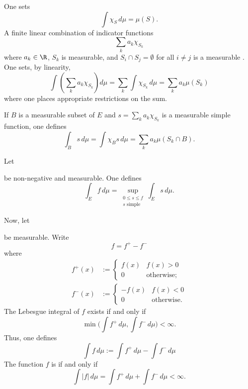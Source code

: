 \documentclass [preview, border = 20pt] {standalone}
\begin{document}
\pagecolor{black}
\color{white}
One sets
\[
  \int \chi_S\, d\mu = \mu(S).
\]
A finite linear combination of indicator functions
\[
  \sum_k a_k\chi_{S_k}
\]
where $a_k\in \R$, $S_k$ is measurable, and $S_i\cap S_j = \emptyset$ for all $i\ne j$ is a measurable . One sets, by linearity,
\[
  \int \left(\sum_k a_k \chi_{S_k}\right) d\mu = \sum_k \int \chi_{S_k}\,d\mu = \sum_k a_k\mu(S_k)
\]
where one places appropriate restrictions on the sum.

If $B$ is a measurable subset of $E$ and $s = \sum_k a_k \chi_{S_k}$ is a measurable simple function, one defines
\[
\int_B s\,d\mu = \int \chi_B s \, d\mu =\sum _k a_k\mu (S_k\cap B).
\]

Let 
\begin{center}
\end{center}
be non-negative and measurable. One defines 
\[
  \int_E f\, d\mu = \sup_{\substack{0\le s\le f\\\textrm{$s$ simple}}} \int_E s\, d\mu.
\]

Now, let
\begin{center}
\end{center}
be measurable. Write 
\[
	f=f^+ - f^-
\]
where
\begin{align*}
  f^+(x) &:= \begin{cases}
  f(x)& f(x)>0\\
  0&\textrm{otherwise;}
  \end{cases}\\
  f^-(x) &:= \begin{cases}
  -f(x)& f(x)<0\\
  0&\textrm{otherwise.}
  \end{cases}
\end{align*}
The Lebesgue integral of $f$ exists if and only if
\[
  \min \Biggl( \int f^+\, d\mu, \int f^-\, d\mu\Biggr) <\infty.
\]
Thus, one defines
\[
  \int f\, d\mu := \int f^+\, d\mu - \int f^-\,d\mu
\]
The function $f$ is  if and only if 
\[
  \int |f| \, d\mu = \int f^+\, d\mu + \int f^-\, d\mu <\infty.
\]
\end{document}
